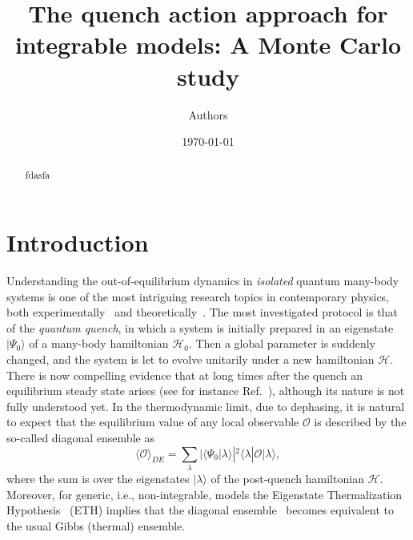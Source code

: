 \documentclass[11pt]{iopart}
\begin{document}
\setlength{\parindent}{0pt}


\title{The quench action approach for integrable models: A Monte Carlo study}

\author{Authors}


\date{\today}



\begin{abstract} 


fdasfa
\end{abstract}

\maketitle

\section{Introduction}
\label{intro}

Understanding the out-of-equilibrium dynamics in {\it isolated} quantum 
many-body systems is one of the most intriguing research topics in 
contemporary physics, both experimentally~\cite{bloch-2008,greiner-2002,
kinoshita-2006,hofferberth-2007,trotzky-2012,gring-2012,cheneau-2012,
schneider-2012,kunhert-2013,langen-2013,meinert-2013,fukuhara-2013,
ronzheimer-2013,braun-2014,langen-2015} and theoretically~\cite{polkovnikov-2011}. 
The most investigated protocol is that of the {\it quantum quench}, in 
which a system is initially prepared in an eigenstate $|\Psi_0\rangle$ of 
a many-body hamiltonian ${\mathcal H}_0$. Then a global parameter is 
suddenly changed, and the system is let to evolve unitarily under a new 
hamiltonian ${\mathcal H}$. There is now compelling evidence that at long 
times after the quench an equilibrium steady state arises (see for instance 
Ref.~\cite{kinoshita-2006}), although its nature is not fully understood yet. 
In the thermodynamic limit, due to dephasing, it is natural to expect that 
the equilibrium value of any local observable ${\mathcal O}$ is described 
by the so-called diagonal ensemble as 
%
\begin{equation}
\label{d-ensemble}
\langle{\mathcal O}\rangle_{DE}=\sum\limits_{\lambda}|\langle\Psi_0|\lambda
\rangle|^2\langle\lambda|{\mathcal O}|\lambda\rangle,
\end{equation}
%
where the sum is over the eigenstates $|\lambda\rangle$ of the post-quench 
hamiltonian ${\mathcal H}$. Moreover, for generic, i.e., non-integrable, models 
the Eigenstate Thermalization Hypothesis~\cite{deutsch-1991,srednicki-1994} 
(ETH) implies that the diagonal ensemble~ becomes equivalent 
to the usual Gibbs (thermal) ensemble. 
\end{document}
